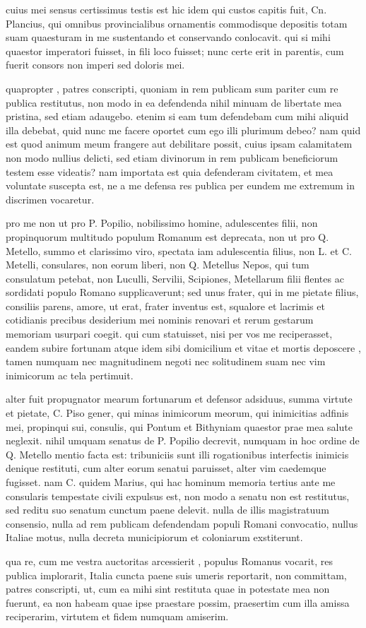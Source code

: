  cuius mei sensus certissimus testis est hic idem qui custos capitis fuit, Cn. Plancius, qui omnibus provincialibus ornamentis commodisque depositis totam suam quaesturam in me sustentando et conservando conlocavit. qui si mihi quaestor imperatori fuisset, in fili loco fuisset; nunc certe erit in parentis, cum fuerit consors non imperi sed doloris mei.

 quapropter , patres conscripti, quoniam in rem publicam sum pariter cum re publica restitutus, non modo in ea defendenda nihil minuam de libertate mea pristina, sed etiam adaugebo. etenim si eam tum defendebam cum mihi aliquid illa debebat, quid nunc me facere oportet cum ego illi plurimum debeo? nam quid est quod animum meum frangere aut debilitare possit, cuius ipsam calamitatem non modo nullius delicti, sed etiam divinorum in rem publicam beneficiorum testem esse videatis? nam importata est quia defenderam civitatem, et mea voluntate suscepta est, ne a me defensa res publica per eundem me extremum in discrimen vocaretur.

 pro me non ut pro P. Popilio, nobilissimo homine, adulescentes filii, non propinquorum multitudo populum Romanum est deprecata, non ut pro Q. Metello, summo et clarissimo viro, spectata iam adulescentia filius, non L. et C. Metelli, consulares, non eorum liberi, non Q. Metellus Nepos, qui tum consulatum petebat, non Luculli, Servilii, Scipiones, Metellarum filii flentes ac sordidati populo Romano supplicaverunt; sed unus frater, qui in me pietate filius, consiliis parens, amore, ut erat, frater inventus est, squalore et lacrimis et cotidianis precibus desiderium mei nominis renovari et rerum gestarum memoriam usurpari coegit. qui cum statuisset, nisi per vos me reciperasset, eandem subire fortunam atque idem sibi domicilium et vitae et mortis deposcere , tamen numquam nec magnitudinem negoti nec solitudinem suam nec vim inimicorum ac tela pertimuit.

 alter fuit propugnator mearum fortunarum et defensor adsiduus, summa virtute et pietate, C. Piso gener, qui minas inimicorum meorum, qui inimicitias adfinis mei, propinqui sui, consulis, qui Pontum et Bithyniam quaestor prae mea salute neglexit. nihil umquam senatus de P. Popilio decrevit, numquam in hoc ordine de Q. Metello mentio facta est: tribuniciis sunt illi rogationibus interfectis inimicis denique restituti, cum alter eorum senatui paruisset, alter vim caedemque fugisset. nam C. quidem Marius, qui hac hominum memoria tertius ante me consularis tempestate civili expulsus est, non modo a senatu non est restitutus, sed reditu suo senatum cunctum paene delevit. nulla de illis magistratuum consensio, nulla ad rem publicam defendendam populi Romani convocatio, nullus Italiae motus, nulla decreta municipiorum et coloniarum exstiterunt.

 qua re, cum me vestra auctoritas arcessierit , populus Romanus vocarit, res publica implorarit, Italia cuncta paene suis umeris reportarit, non committam, patres conscripti, ut, cum ea mihi sint restituta quae in potestate mea non fuerunt, ea non habeam quae ipse praestare possim, praesertim cum illa amissa reciperarim, virtutem et fidem numquam amiserim.
